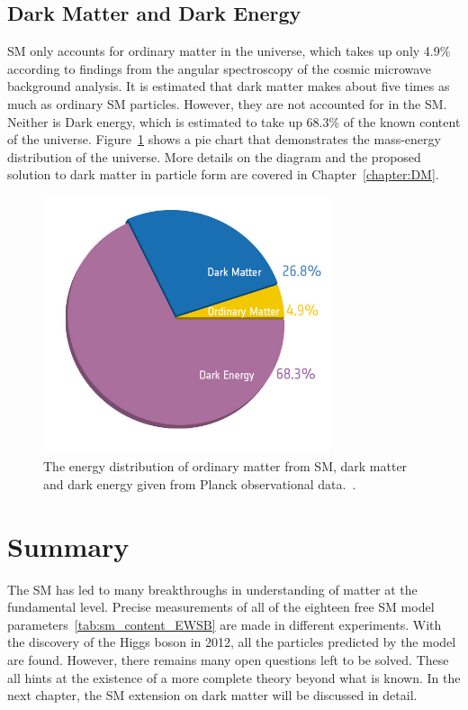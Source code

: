 {\subsection{Dark Matter and Dark Energy}
SM only accounts for ordinary matter in the universe, which takes up only 4.9\% according to findings from the angular spectroscopy of the cosmic microwave background analysis. It is estimated that dark matter makes about five times as much as ordinary SM particles. However, they are not accounted for in the SM.
Neither is Dark energy, which is estimated to take up 68.3\% of the known content of the universe. Figure~\ref{fig:planck} shows a pie chart that demonstrates the mass-energy distribution of the universe. More details on the diagram and the proposed solution to dark matter in particle form are covered in Chapter~\ref{chapter:DM}.

    \begin{figure}[!htb]
        \begin{center}
            \includegraphics[width=0.75\textwidth]{figures/chapter_SM/Planck}
            \caption{
                The energy distribution of ordinary matter from SM, dark matter and dark energy given from Planck observational data.~\cite{ade2016planck}.
            }
            \label{fig:planck}
        \end{center}
    \end{figure}

\section{Summary}
The SM has led to many breakthroughs in understanding of matter at the fundamental level. Precise measurements of all of the eighteen free SM model parameters~\ref{tab:sm_content_EWSB} are made in different experiments. With the discovery of the Higgs boson in 2012, all the particles predicted by the model are found. However, there remains many open questions left to be solved. These all hints at the existence of a more complete theory beyond what is known. In the next chapter, the SM extension on dark matter will be discussed in detail. 


}
